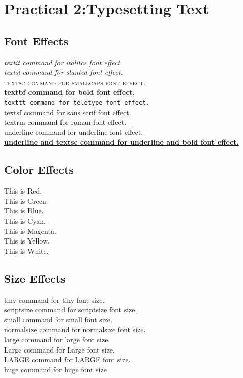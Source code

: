 \documentclass[a4paper,12pt]{report}
\begin{document}
\chapter*{Practical 2:Typesetting Text }

\section{Font Effects}
\textit{textit command for italitcs font effect.}\\
\textsl{textsl command for slanted font effect.}\\
\textsc{textsc command for smallcaps font effect.}\\
\textbf{textbf command for bold font effect.}\\
\texttt{texttt command for teletype font effect.}\\
\textsf{textsf command for sans serif font effect.}\\
\textrm{textrm command for roman font effect.}\\
\underline{underline command for underline font effect.}\\
\underline{\textbf{underline and textsc command for underline and bold font effect.}}\\

\section{Color Effects}
{\color{red}This is Red.}\\
{\color{green}This is Green.}\\
{\color{blue}This is Blue.}\\
{\color{cyan}This is Cyan.}\\
{\color{magenta}This is Magenta.}\\
{\color{yellow} This is Yellow.}\\
{\color{white}This is White.}\\

\section{Size Effects}
{\tiny tiny command for tiny font size.}\\
{\scriptsize scriptsize  command for scriptsize font size.}\\
{\small small command for small font size.}\\
{\normalsize normalsize command for normalsize font size.}\\
{\large large command for large font size.}\\
{\Large Large command for Large font size.}\\
{\LARGE LARGE  command for LARGE font size.}\\
{\huge huge command for huge font size}\\
\end{document}
